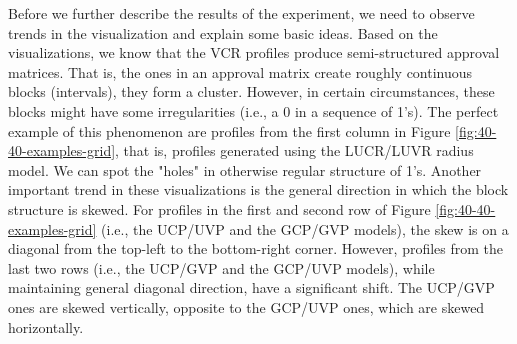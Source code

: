 Before we further describe the results of the experiment, 
we need to observe trends in the visualization and explain some basic ideas.
Based on the visualizations, we know that the VCR profiles produce semi-structured approval matrices.
That is, the ones in an approval matrix create roughly continuous blocks (intervals), they form a cluster.
However, in certain circumstances, these blocks might have some irregularities (i.e., a 0 in a sequence of 1's).
The perfect example of this phenomenon are profiles from the first column in Figure \ref{fig:40-40-examples-grid}, that is,
profiles generated using the LUCR/LUVR radius model. We can spot the "holes" in otherwise regular structure of 1's.
Another important trend in these visualizations is the general direction in which the block structure is skewed.
For profiles in the first and second row of Figure \ref{fig:40-40-examples-grid} (i.e., the UCP/UVP and the GCP/GVP models),
the skew is on a diagonal from the top-left to the bottom-right corner.
However, profiles from the last two rows (i.e., the UCP/GVP and the GCP/UVP models),
while maintaining general diagonal direction, have a significant shift.
The UCP/GVP ones are skewed vertically, opposite to the GCP/UVP ones, which are skewed horizontally.

